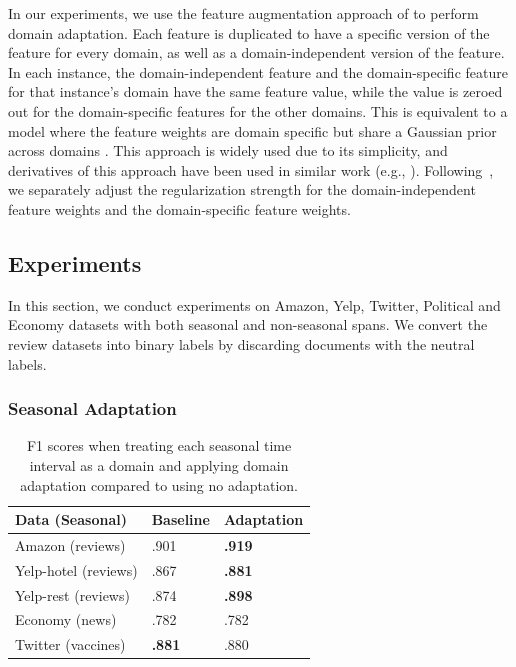 In our experiments, we use the feature augmentation approach of \cite{daume2007frustratingly} to perform domain adaptation. Each feature is duplicated to have a specific version of the feature for every domain, as well as a domain-independent version of the feature. In each instance, the domain-independent feature and the domain-specific feature for that instance's domain have the same feature value, while the value is zeroed out for the domain-specific features for the other domains. This is equivalent to a model where the feature weights are domain specific but share a Gaussian prior across domains \cite{Finkel09}.
This approach is widely used due to its simplicity, and derivatives of this approach have been used in similar work (e.g., \cite{lynn2017human}).
Following~\cite{Finkel09}, we separately adjust the regularization strength for the domain-independent feature weights and the domain-specific feature weights.

\subsection{Experiments}

In this section, we conduct experiments on Amazon, Yelp, Twitter, Political and Economy datasets with both seasonal and non-seasonal spans. 
We convert the review datasets into binary labels by discarding documents with the neutral labels.

\subsubsection{Seasonal Adaptation}

\begin{table}[htp]
\centering
\begin{tabular}{|l|l|l|}
\hline
\bf Data (Seasonal) & \bf Baseline & \bf Adaptation \\
\hline
Amazon (reviews) & .901 & \bf .919 \\
Yelp-hotel (reviews) & .867 & \bf .881 \\
Yelp-rest (reviews) & .874 & \bf .898  \\
Economy (news) & .782 & .782  \\
Twitter (vaccines) & \bf .881 & .880  \\
\hline
\end{tabular}
\caption{\label{chap3:tab:results_seasonal} F1 scores when treating each seasonal time interval as a domain and applying domain adaptation compared to using no adaptation.}
\end{table}

